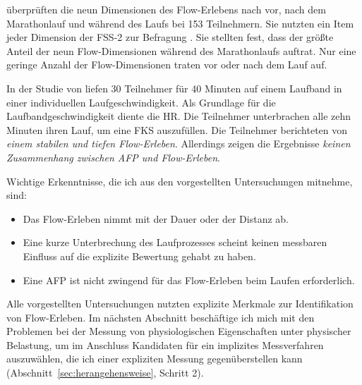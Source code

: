 \citet{Jimenez-Torres2013} überprüften die neun Dimensionen des Flow-Erlebens nach \citet{Csikszentmihalyi1992} vor, nach dem Marathonlauf und während des Laufs bei 153 Teilnehmern. Sie nutzten ein Item jeder Dimension der \ac{FSS}-2 zur Befragung \citep{Jackson2002}. Sie stellten fest, dass der größte Anteil der neun Flow-Dimensionen während des Marathonlaufs auftrat. Nur eine geringe Anzahl der Flow-Dimensionen traten vor oder nach dem Lauf auf. 

In der Studie von \citet{Reinhardt2006} liefen 30 Teilnehmer für 40 Minuten auf einem Laufband in einer individuellen Laufgeschwindigkeit. Als Grundlage für die Laufbandgeschwindigkeit diente die \ac{HR}. Die Teilnehmer unterbrachen alle zehn Minuten ihren Lauf, um eine \ac{FKS} auszufüllen. Die Teilnehmer berichteten von \emph{einem stabilen und tiefen Flow-Erleben}. Allerdings zeigen die Ergebnisse \emph{keinen Zusammenhang zwischen \ac{AFP} und Flow-Erleben}.

\newpage

Wichtige Erkenntnisse, die ich aus den vorgestellten Untersuchungen mitnehme, sind: 
\begin{itemize}
	
	\item Das Flow-Erleben nimmt mit der Dauer oder der Distanz ab.
	
	\item Eine kurze Unterbrechung des Laufprozesses scheint keinen messbaren Einfluss auf die explizite Bewertung gehabt zu haben.
	
	\item Eine \ac{AFP} ist nicht zwingend für das Flow-Erleben beim Laufen erforderlich. 
\end{itemize}

Alle vorgestellten Untersuchungen nutzten explizite Merkmale zur Identifikation von Flow-Erleben. Im nächsten Abschnitt beschäftige ich mich mit den Problemen bei der Messung von physiologischen Eigenschaften unter physischer Belastung, um im Anschluss Kandidaten für ein implizites Messverfahren auszuwählen, die ich einer expliziten Messung gegenüberstellen kann (Abschnitt~\ref{sec:herangehensweise}, Schritt 2). 

